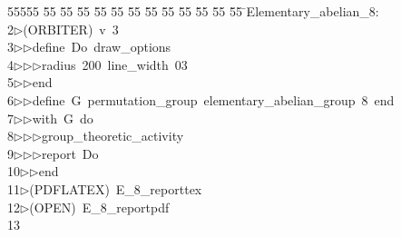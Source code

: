 %
%
\begin{tabbing}
55555 \= 55 \= 55 \= 55 \= 55 \= 55 \= 55 \= 55 \= 55 \= 55 \= 55 \= 55 \= 55 \= \>Elementary\_abelian\_8:\\[0pt]
2\>$\triangleright$\>(ORBITER)\ v\ 3\ \\[0pt]
3\>$\triangleright$\>$\triangleright$\>define\ Do\ draw\_options\ \\[0pt]
4\>$\triangleright$\>$\triangleright$\>$\triangleright$\>radius\ 200\ line\_width\ 03\ \\[0pt]
5\>$\triangleright$\>$\triangleright$\>end\ \\[0pt]
6\>$\triangleright$\>$\triangleright$\>define\ G\ permutation\_group\ elementary\_abelian\_group\ 8\ end\ \\[0pt]
7\>$\triangleright$\>$\triangleright$\>with\ G\ do\ \\[0pt]
8\>$\triangleright$\>$\triangleright$\>$\triangleright$\>group\_theoretic\_activity\ \\[0pt]
9\>$\triangleright$\>$\triangleright$\>$\triangleright$\>report\ Do\ \\[0pt]
10\>$\triangleright$\>$\triangleright$\>end\\[0pt]
11\>$\triangleright$\>(PDFLATEX)\ E\_8\_reporttex\\[0pt]
12\>$\triangleright$\>(OPEN)\ E\_8\_reportpdf\\[0pt]
13\>\end{tabbing}
